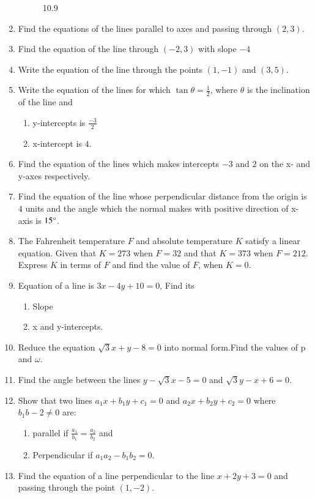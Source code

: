 \documentclass{article}
\theoremstyle{remark}
\begin{document}
\begin{enumerate}
\begin{figure}[h]
\caption{10.9}
  \label{fig:10.9}
\end{figure}
\item Find the equations of the lines parallel to axes and passing through $(2,3)$.
\item Find the equation of the line through $(-2,3)$ with slope $-4$
\item Write the equation of the line through the points $(1,-1)$ and $(3,5)$.
\item Write the equation of the lines for which $\tan \theta=\frac{1}{2}$, where $\theta$ is the inclination of the line and
\begin{enumerate}[label=(\roman*)]
\item  y-intercepts is $\frac{-3}{2}$ 
\item  x-intercept is $4$.
\end{enumerate}
\item Find the equation of the lines which makes intercepts $-3$ and $2$ on the x- and y-axes respectively.
\item Find the equation of the line whose perpendicular distance from the origin is $4$ units and the angle which the normal makes with positive direction of x-axis is $15\degree$.
\item The Fahrenheit temperature $F$ and  absolute temperature $K$ satisfy a linear equation. Given that $K=273$ when $F=32$ and that $K=373$ when $F=212$. Express $K$ in terms of $F$ and find the value of $F$, when $K=0$.
\item Equation of a line is $3x-4y+10=0$, Find its
\begin{enumerate}[label=(\roman*)]
\item  Slope
\item  x and y-intercepts.
\end{enumerate}
\item Reduce the equation $\sqrt3x+y-8=0$ into normal form.Find the values of p and $\omega$.
\item Find the angle between the lines $y-\sqrt 3x-5=0$ and $\sqrt 3y-x+6=0$.
\item Show that two lines $a_1x+b_1y+c_1=0$ and $a_2x+b_2y+c_2=0$ where $b_1b-2\neq 0$ are:
\begin{enumerate}
\item parallel if $\frac{a_1}{b_1}=\frac{a_2}{b_2}$ and 
\item Perpendicular if $a_1a_2-b_1b_2=0$.
\end {enumerate}
\item Find the equation of a line perpendicular to the line $x+2y+3=0$ and passing through the point $(1,-2)$.

\end{enumerate}
\end{document}
